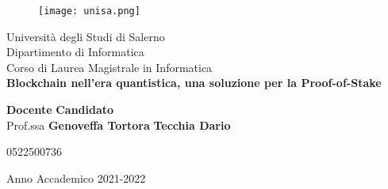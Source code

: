 \begin{titlepage}
  \begin{center}
    \begin{figure}
        \texttt{[image: unisa.png]}
        \centering
      \end{figure}
    {\Large Università degli Studi di Salerno}\\[0.2truecm]
    {\large Dipartimento di Informatica}\\
    \hrulefill
    \vfill
    {\large Corso di Laurea Magistrale in Informatica}\\[0.2truecm]
    \vfill\vfill
    {\LARGE
      {\bf 
        Blockchain nell'era quantistica, una soluzione per la Proof-of-Stake
      }
    }
    
    \vfill\vfill
    
    
    {\bf Docente} \hfill {\bf Candidato} \\
    Prof.ssa \textbf{Genoveffa Tortora} \hfill  \textbf{Tecchia Dario}
    \centerline{\hfill 0522500736}
    
    
    \vfill
    \hrulefill 
    \begin{center} Anno Accademico 2021-2022 \end{center}
    
  \end{center}
\end{titlepage}
  
\setcounter{page}{1} 		
